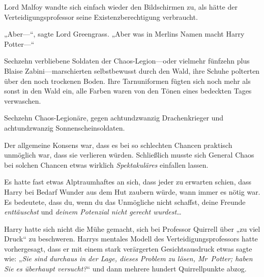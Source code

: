 Lord Malfoy wandte sich einfach wieder den Bildschirmen zu, als hätte der Verteidigungsprofessor seine Existenzberechtigung verbraucht.

„Aber—“, sagte Lord Greengrass. „Aber was in Merlins Namen macht Harry Potter—“

\later

Sechzehn verbliebene Soldaten der Chaos-Legion—oder vielmehr fünfzehn plus Blaise Zabini—marschierten selbstbewusst durch den Wald, ihre Schuhe polterten über den noch trockenen Boden. Ihre Tarnuniformen fügten sich noch mehr als sonst in den Wald ein, alle Farben waren von den Tönen eines bedeckten Tages verwaschen.

Sechzehn Chaos-Legionäre, gegen achtundzwanzig Drachenkrieger und achtundzwanzig Sonnenscheinsoldaten.

Der allgemeine Konsens war, dass es bei so schlechten Chancen praktisch unmöglich war, dass sie verlieren würden. Schließlich musste sich General Chaos bei solchen Chancen etwas wirklich \emph{Spektakuläres} einfallen lassen.

Es hatte fast etwas Alptraumhaftes an sich, dass jeder zu erwarten schien, dass Harry bei Bedarf Wunder aus dem Hut zaubern würde, wann immer es nötig war. Es bedeutete, dass du, wenn du das Unmögliche nicht schaffst, deine Freunde \emph{enttäuschst} und \emph{deinem Potenzial nicht gerecht wurdest}…

Harry hatte sich nicht die Mühe gemacht, sich bei Professor Quirrell über „zu viel Druck“ zu beschweren. Harrys mentales Modell des Verteidigungsprofessors hatte vorhergesagt, dass er mit einem stark verärgerten Gesichtsausdruck etwas sagte wie: „\emph{Sie sind durchaus in der Lage, dieses Problem zu lösen, Mr~Potter; haben Sie es überhaupt versucht?}“ und dann mehrere hundert Quirrellpunkte abzog.

